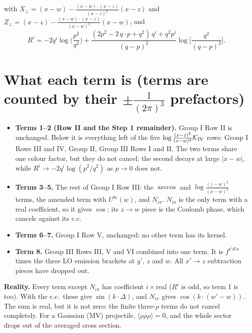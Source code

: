 \documentclass[9pt]{article}
\numberwithin{equation}{section}
\begin{document}
with $X_{\perp}=(x-w)-\frac{(x-w)\cdot(x-z)}{(x-z)^{2}}(x-z)$ and $Z_{\perp}=(x-z)-\frac{(x-w)\cdot(x-z)}{(x-w)^{2}}(x-w)$, and
\begin{equation}
R^{i}=-2q^{i}\log\Big(\frac{p^{2}}{q^{2}}\Big)+\frac{(2p^{2}-2\,q\cdot p+q^{2})\,q^{i}+q^{2}p^{i}}{(q-p)^{2}}\log\Big[\frac{q^{2}}{(q-p)^{2}}\Big].
\end{equation}

\section*{What each term is (terms are counted by their $\pm\frac{1}{(2\pi)^{3}}$ prefactors)}
\begin{itemize}
\item \textbf{Terms 1--2 (Row II and the Step 1 remainder).} Group I Row II is unchanged. Below it is everything left of the five $\log\frac{(x-z)^{2}}{(x-w)^{2}}\mathcal K_{\rm IV}$ rows: Group I Rows III and IV, Group II, Group III Rows I and II. The two terms share one colour factor, but they do not cancel: the second decays at large $|x-w|$, while $R^{i}\to-2q^{i}\log(p^{2}/q^{2})$ as $p\to0$ does not.
\item \textbf{Terms 3--5.} The rest of Group I Row III: the $\arccos$ and $\log\frac{(z-w)^{2}}{(x-w)^{2}}$ terms, the amended term with $U^{bc}(w)$, and $N_{i\pi}$. $N_{i\pi}$ is the only term with a real coefficient, so it gives $\cos$; its $z\to w$ piece is the Coulomb phase, which cancels against its c.c.
\item \textbf{Terms 6--7.} Group I Row V, unchanged: no other term has its kernel.
\item \textbf{Term 8.} Group III Rows III, V and VI combined into one term. It is $f^{c'd'a}$ times the three LO emission brackets at $y'$, $z$ and $w$. All $x'\to z$ subtraction pieces have dropped out.
\end{itemize}
\textbf{Reality.} Every term except $N_{i\pi}$ has coefficient $i\times$real ($R^{i}$ is odd, so term 1 is too). With the c.c.\ these give $\sin(k\cdot\Delta)$, and $N_{i\pi}$ gives $\cos(k\cdot(w'-w))$. The sum is real, but it is not zero: the finite three-$\rho$ terms do not cancel completely. For a Gaussian (MV) projectile, $\langle\rho\rho\rho\rangle=0$, and the whole sector drops out of the averaged cross section.
\end{document}
